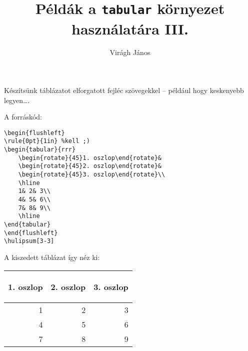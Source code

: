 \documentclass{article}
\author{Virágh János}
\title{Példák a \texttt{tabular} környezet használatára III.}
\begin{document}
\maketitle
	
Készítsünk táblázatot elforgatott fejléc szövegekkel -- például hogy keskenyebb legyen\dots.

A forráskód:
	
\begin{verbatim}	
\begin{flushleft}
\rule{0pt}{1in} %kell ;)
\begin{tabular}{rrr}
    \begin{rotate}{45}1. oszlop\end{rotate}&
    \begin{rotate}{45}2. oszlop\end{rotate}&
    \begin{rotate}{45}3. oszlop\end{rotate}\\
    \hline
    1& 2& 3\\
    4& 5& 6\\
    7& 8& 9\\
    \hline
\end{tabular}
\end{flushleft}
\hulipsum[3-3]
\end{verbatim}

A kiszedett táblázat így néz ki:

\begin{flushleft}
	\rule{0pt}{1in} %
	\begin{tabular}{rrr}
		\begin{rotate}{45}1. oszlop\end{rotate}&
		\begin{rotate}{45}2. oszlop\end{rotate}&
		\begin{rotate}{45}3. oszlop\end{rotate}\\
		\hline
		1& 2& 3\\
		4& 5& 6\\
		7& 8& 9\\
		\hline
	\end{tabular}
\end{flushleft}
\hulipsum[1]
\end{document}
